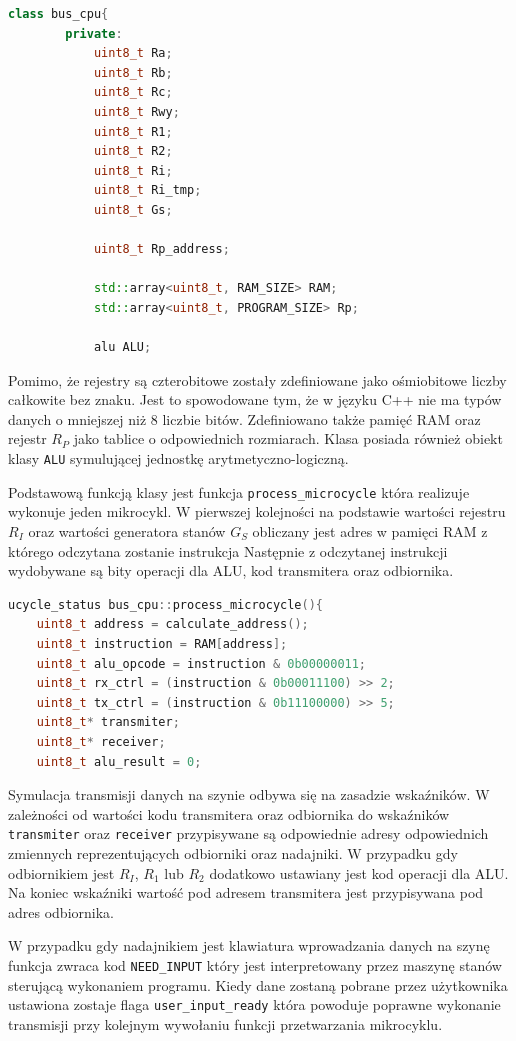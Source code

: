\documentclass[../main.tex]{subfiles}
\begin{document}
\begin{lstlisting}[language=C++]
    class bus_cpu{
        private:
            uint8_t Ra;
            uint8_t Rb;
            uint8_t Rc;
            uint8_t Rwy;
            uint8_t R1;
            uint8_t R2;
            uint8_t Ri;
            uint8_t Ri_tmp;
            uint8_t Gs;
        
            uint8_t Rp_address;
        
            std::array<uint8_t, RAM_SIZE> RAM;
            std::array<uint8_t, PROGRAM_SIZE> Rp;
        
            alu ALU;
\end{lstlisting}

Pomimo, że rejestry są czterobitowe zostały zdefiniowane jako ośmiobitowe liczby całkowite bez znaku. Jest to spowodowane tym, że w języku C++ nie 
ma typów danych o mniejszej niż 8 liczbie bitów. Zdefiniowano także pamięć RAM oraz rejestr $R_P$ jako tablice o odpowiednich rozmiarach. 
Klasa posiada również obiekt klasy \texttt{ALU} symulującej jednostkę arytmetyczno-logiczną.
\par
Podstawową funkcją klasy jest funkcja \texttt{process\_microcycle} która realizuje wykonuje jeden mikrocykl. 
W pierwszej kolejności na podstawie wartości rejestru $R_I$ oraz wartości generatora stanów $G_S$ obliczany jest adres w pamięci RAM z którego 
odczytana zostanie instrukcja Następnie z odczytanej instrukcji wydobywane są bity operacji dla ALU, kod transmitera oraz odbiornika. 

\begin{lstlisting}[language=C++]
    ucycle_status bus_cpu::process_microcycle(){
    uint8_t address = calculate_address();
    uint8_t instruction = RAM[address]; 
    uint8_t alu_opcode = instruction & 0b00000011;
    uint8_t rx_ctrl = (instruction & 0b00011100) >> 2;
    uint8_t tx_ctrl = (instruction & 0b11100000) >> 5;
    uint8_t* transmiter;
    uint8_t* receiver;
    uint8_t alu_result = 0;
\end{lstlisting}
\par
Symulacja transmisji danych na szynie odbywa się na zasadzie wskaźników. W zależności od wartości kodu transmitera oraz odbiornika do
wskaźników \texttt{transmiter} oraz \texttt{receiver} przypisywane są odpowiednie adresy odpowiednich zmiennych reprezentujących odbiorniki oraz nadajniki.
W przypadku gdy odbiornikiem jest $R_I$, $R_1$ lub $R_2$ dodatkowo ustawiany jest kod operacji dla ALU. 
Na koniec wskaźniki wartość pod adresem transmitera jest przypisywana pod adres odbiornika.
\par
W przypadku gdy nadajnikiem jest klawiatura wprowadzania danych na szynę funkcja zwraca kod \texttt{NEED\_INPUT} który jest interpretowany
przez maszynę stanów sterującą wykonaniem programu. Kiedy dane zostaną pobrane przez użytkownika ustawiona zostaje flaga \texttt{user\_input\_ready}
która powoduje poprawne wykonanie transmisji przy kolejnym wywołaniu funkcji przetwarzania mikrocyklu.
\end{document}
